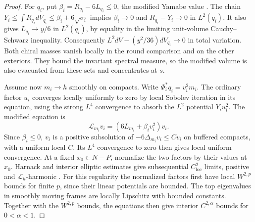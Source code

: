 \begin{proof}
For \(q_i\), put \(\beta_i=R_{q_i}-6L_{q_i}\le0\), the modified
Yamabe value
\cite[Lemma~2.1 and Theorem~1.7]{ChenZhu2014Conformal}.
The chain \(Y_i\le\int R_{q_i}dV_{q_i}
   \le\beta_i+6\sqrt{\sigma_i}\) implies
\(\beta_i\to0\) and \(R_{q_i}-Y_i\to0\) in \(L^2(q_i)\).
It also gives \(L_{q_i}\to y/6\) in \(L^2(q_i)\), by
equality in the limiting unit-volume Cauchy--Schwarz inequality.
Consequently \(L^2dV-(y^2/36)dV_{q_i}\to0\) in total variation.
Both chiral masses vanish locally in the round comparison and
on the other exteriors. They bound the invariant spectral
measure, so the modified volume is also evacuated from these
sets and concentrates at \(s\).

Assume now \(m_i\to h\) smoothly on compacts. Write
\(\Phi_i^*q_i=v_i^2m_i\).
The ordinary factor \(u_i\) converges locally uniformly to zero
by local Sobolev iteration in its equation, using the strong
\(L^4\) convergence to absorb the \(L^2\) potential \(Y_i u_i^2\).
The modified equation is
\[
 \mathcal L_{m_i}v_i=(6L_{m_i}+\beta_i v_i^2)v_i .
\]
Since \(\beta_i\le0\), \(v_i\) is a positive subsolution of
\(-6\Delta_{m_i}v_i\le C v_i\) on buffered compacts, with a
uniform local \(C\). Its \(L^4\) convergence to zero then gives
local uniform convergence. At a fixed \(x_0\in N-P\), normalize
the two factors by their values at \(x_0\). Harnack and interior
elliptic estimates give subsequential \(C^2_{\mathrm{loc}}\)
limits, positive and \(\mathcal L_h\)-harmonic
\cite[Sections 6.1 and 8.5--8.8]{GilbargTrudinger2001Elliptic}.
For this regularity the normalized factors first have local
\(W^{2,p}\) bounds for finite \(p\), since their linear potentials
are bounded. The top eigenvalues in smoothly moving frames
are locally Lipschitz with bounded constants. Together with the
\(W^{2,p}\) bounds, the equations then give interior
\(C^{2,\alpha}\) bounds for \(0<\alpha<1\).


\end{proof}
